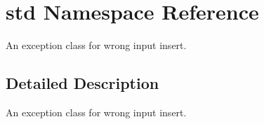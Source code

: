 \hypertarget{namespacestd}{
\section{std Namespace Reference}
\label{namespacestd}
}
An exception class for wrong input insert.  




\subsection{Detailed Description}
An exception class for wrong input insert. 